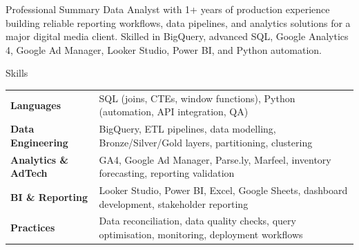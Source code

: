 \documentclass{resume}
\begin{document}
\vspace{-10pt}

\begin{rSection}{Professional Summary}
Data Analyst with 1+ years of production experience building reliable reporting workflows, data pipelines, and analytics solutions for a major digital media client. Skilled in BigQuery, advanced SQL, Google Analytics 4, Google Ad Manager, Looker Studio, Power BI, and Python automation.
\end{rSection}

\vspace{-5pt}

\begin{rSection}{Skills}
\begin{tabular}{ @{} >{\bfseries}l p{\dimexpr\textwidth-1.35in} }
Languages & SQL (joins, CTEs, window functions), Python (automation, API integration, QA) \\
Data Engineering & BigQuery, ETL pipelines, data modelling, Bronze/Silver/Gold layers, partitioning, clustering \\
Analytics \& AdTech & GA4, Google Ad Manager, Parse.ly, Marfeel, inventory forecasting, reporting validation \\
BI \& Reporting & Looker Studio, Power BI, Excel, Google Sheets, dashboard development, stakeholder reporting \\
Practices & Data reconciliation, data quality checks, query optimisation, monitoring, deployment workflows \\
\end{tabular}
\end{rSection}

\vspace{-5pt}
\end{document}
